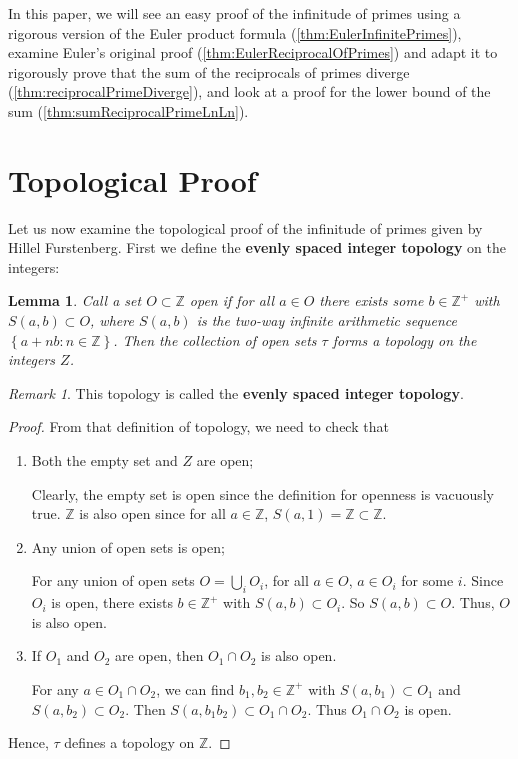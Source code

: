 \documentclass[a4paper]{article}
\newtheorem{lemma}[theorem]{Lemma}
\theoremstyle{definition}
\theoremstyle{remark}
\newtheorem*{remark}{Remark}
\begin{document}
In this paper, we will see an easy proof of the infinitude of primes using a rigorous version of the Euler product formula (\cref{thm:EulerInfinitePrimes}), examine Euler's original proof (\cref{thm:EulerReciprocalOfPrimes}) and adapt it to rigorously prove that the sum of the reciprocals of primes diverge (\cref{thm:reciprocalPrimeDiverge}), and look at a proof for the lower bound of the sum (\cref{thm:sumReciprocalPrimeLnLn}).
\section{Topological Proof}
\label{sec:topological}
Let us now examine the topological proof of the infinitude of primes given by Hillel Furstenberg.
First we define the \textbf{evenly spaced integer topology} on the integers:
\begin{lemma}
  Call a set $O\subset\mathbb{Z}$ open if for all $a\in O$ there exists some $b\in\mathbb{Z^+}$ with $S(a,b)\subset O$, where $S(a,b)$ is the two-way infinite arithmetic sequence $\left\{ a+nb:n\in\mathbb{Z} \right\}$. Then the collection of open sets $\tau$ forms a topology on the integers $Z$.
  \label{lem:esip}
\end{lemma}
\begin{remark}
  This topology is called the \textbf{evenly spaced integer topology}.
  \label{rem:esip}
\end{remark}
\begin{proof}
  From that definition of topology, we need to check that
  \begin{enumerate}
    \item Both the empty set and $Z$ are open;

      Clearly, the empty set is open since the definition for openness is vacuously true. $\mathbb{Z}$ is also open since for all $a\in\mathbb{Z}$, $S(a,1)=\mathbb{Z}\subset\mathbb{Z}$.
    \item Any union of open sets is open;

      For any union of open sets $O=\bigcup\limits_i O_i$, for all $a\in O$, $a\in O_i$ for some $i$. Since $O_i$ is open, there exists $b\in\mathbb{Z^+}$ with $S(a,b)\subset O_i$. So $S(a,b)\subset O$. Thus, $O$ is also open.
    \item If $O_1$ and $O_2$ are open, then $O_1\cap O_2$ is also open.

      For any $a\in O_1\cap O_2$, we can find $b_1,b_2\in\mathbb{Z^+}$ with $S(a,b_1)\subset O_1$ and $S(a,b_2)\subset O_2$. Then $S(a,b_1b_2)\subset O_1\cap O_2$. Thus $O_1\cap O_2$ is open.

  \end{enumerate}
  Hence, $\tau$ defines a topology on $\mathbb{Z}$.
\end{proof}
\end{document}
